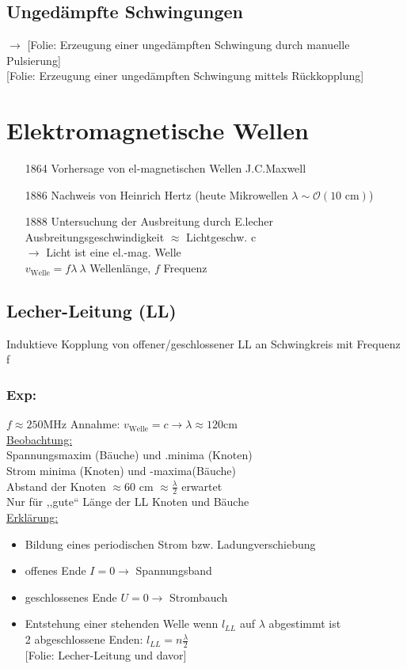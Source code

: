 \documentclass[titlepage,12pt,a4paper,ngerman]{report}
\newcommand{\tx}[1]{\textrm{#1}}
\newcommand{\folie}[1]{\color{gray}[Folie: #1]\color{black}}
\begin{document}
\subsection{Ungedämpfte Schwingungen}
$ \rightarrow $ \folie{Erzeugung einer ungedämpften Schwingung durch manuelle Pulsierung}\\
\folie{Erzeugung einer ungedämpften Schwingung mittels Rückkopplung}


\section{Elektromagnetische Wellen}
\begin{itemize}
	\item[1864] Vorhersage von el-magnetischen Wellen J.C.Maxwell
	\item[1886] Nachweis von Heinrich Hertz (heute Mikrowellen $ \lambda \sim \mathcal{O} (\tx{10 cm}) $)
	\item[1888] Untersuchung der Ausbreitung durch E.lecher\\
	Ausbreitungsgeschwindigkeit $ \approx $ Lichtgeschw. c\\
	$ \rightarrow $ Licht ist eine el.-mag. Welle\\
	$ v_{\tx{Welle}} = f \lambda \ \lambda $ Wellenlänge, $ f $ Frequenz
\end{itemize}

\subsection{Lecher-Leitung (LL)}
Induktieve Kopplung von offener/geschlossener LL an Schwingkreis mit Frequenz f
\subsubsection{Exp:}
$ f \approx 250 \tx{MHz} $ Annahme: $ v_{\tx{Welle}} = c \rightarrow \lambda \approx 120 \tx{cm} $ \\
\underline{Beobachtung:}\\
Spannungsmaxim (Bäuche) und .minima (Knoten)\\
Strom minima (Knoten) und -maxima(Bäuche)\\
Abstand der Knoten $ \approx 60 $ cm $ \approx \frac{\lambda}{2} $ erwartet\\
Nur für ,,gute`` Länge der LL Knoten und Bäuche\\[5pt]
\underline{Erklärung:}
\begin{itemize}
	\item Bildung eines periodischen Strom bzw. Ladungverschiebung
	\item offenes Ende $ I = 0 \rightarrow $ Spannungsband
	\item geschlossenes Ende $ U = 0 \rightarrow $ Strombauch
	\item Entstehung einer stehenden Welle wenn $ l_{LL} $ auf $ \lambda $ abgestimmt ist\\
	2 abgeschlossene Enden: $ l_{LL} = n \frac{\lambda}{2} $\\
	\folie{Lecher-Leitung und davor}
\end{itemize}
\end{document}

